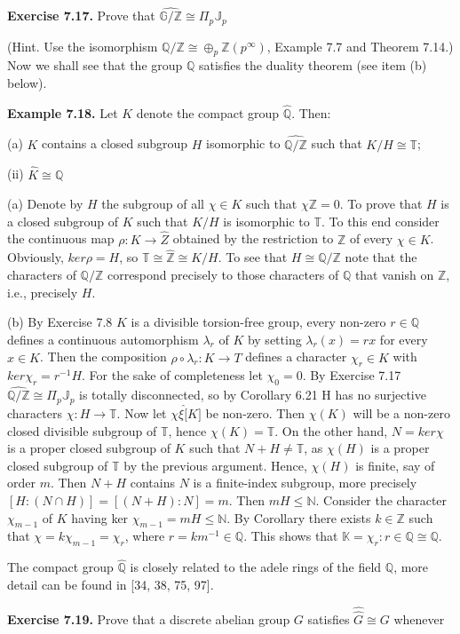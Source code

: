 \documentclass[12pt]{article}
\begin{document}
\textbf{Exercise 7.17.} Prove that $\hat{\mathbb{G}/\mathbb{Z}} \cong \Pi_p \mathbb{J}_p$


(Hint. Use the isomorphism $\mathbb{Q}/\mathbb{Z} \cong \oplus_p \mathbb{Z}(p^{\infty})$, Example 7.7 and Theorem 7.14.)
Now we shall see that the group $\mathbb{Q}$ satisfies the duality theorem (see item (b) below).


\textbf{Example 7.18.} Let $K$ denote the compact group $\hat{\mathbb{Q}}$. Then: 


    (a) $K$ contains a closed subgroup $H$ isomorphic to $\hat{\mathbb{Q}/\mathbb{Z}}$ such that $K/H \cong \mathbb{T}$;

    (ii) $\hat{K} \cong \mathbb{Q}$


    (a) Denote by $H$ the subgroup of all $\chi \in K$ such that $\chi{\mathbb{Z}} = 0$. To prove that $H$ is a closed subgroup of $K$ such
that $K/H$ is isomorphic to $\mathbb{T}$. To this end consider the continuous map $\rho : K \to \hat{Z}$ obtained by the restriction
to $\mathbb{Z}$ of every $\chi \in K$. Obviously, $ker \rho = H$, so $\mathbb{T} \cong \hat{\mathbb{Z}} \cong K/H$. To see that $H \cong \hat{\mathbb{Q}/\mathbb{Z}}$ note that the characters
of $\mathbb{Q}/\mathbb{Z}$ correspond precisely to those characters of $\mathbb{Q}$ that vanish on $\mathbb{Z}$, i.e., precisely $H$.

    
    (b) By Exercise 7.8 $K$ is a divisible torsion-free group, every non-zero $r \in \mathbb{Q}$ defines a continuous automorphism
$\lambda_r$ of $K$ by setting $\lambda_r(x) = rx$ for every $x \in K$. Then the composition $\rho \circ \lambda_r : K \to T$ defines a character
$\chi_r \in \hat{K}$ with $ker \chi_r = r^{-1} H$. For the sake of completeness let $\chi_0 = 0$. By Exercise 7.17 $\hat{\mathbb{Q}/\mathbb{Z}} \cong \Pi_p \mathbb{J}_p$ is totally
disconnected, so by Corollary 6.21 H has no surjective characters $\chi : H \to \mathbb{T}$. Now let $\chi \xi \hat[K]$ be non-zero.
Then $\chi(K)$ will be a non-zero closed divisible subgroup of $\mathbb{T}$, hence $\chi(K) = \mathbb{T}$. On the other hand, $N = ker \chi$ is
a proper closed subgroup of $K$ such that $N + H \neq \mathbb{T}$, as $\chi(H)$ is a proper closed subgroup of $\mathbb{T}$ by the previous
argument. Hence, $\chi(H)$ is finite, say of order $m$. Then $N + H$ contains $N$ is a finite-index subgroup, more
precisely $[H : (N \cap H)] = [(N + H) : N] = m$. Then $mH \leq \mathbb{N}$. Consider the character $\chi_{m-1}$ of $K$ having
ker $\chi_{m-1} = mH \leq \mathbb{N}$. By Corollary there exists $k \in \mathbb{Z}$ such that $\chi = k\chi_{m-1} = \chi_r$, where $r = km^{-1} \in \mathbb{Q}$. This
shows that $\mathbb{K} = {\chi_r : r \in \mathbb{Q}} \cong \mathbb{Q}$.


    The compact group $\hat{\mathbb{Q}}$ is closely related to the adele rings of the field $\mathbb{Q}$, more detail can be found in
[34, 38, 75, 97].
    

\textbf{Exercise 7.19.} Prove that a discrete abelian group $G$ satisfies $\hat{\hat{G}} \cong G$ whenever
\maketitle
\end{document}
